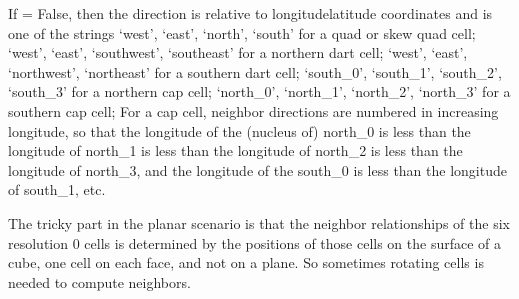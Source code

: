 \documentclass[a4paper,12ptopenany,oneside,english]{sphinxmanual}
\begin{document}
\begin{fulllineitems}
\begin{fulllineitems}
\begin{sphinxVerbatim}[commandchars=\\\{\}]
                
                
                
                 
              
                 
                
                
                
\end{sphinxVerbatim}

\sphinxAtStartPar
If  = False, then the direction is relative to
longitude\sphinxhyphen{}latitude coordinates and is one of the strings
‘west’, ‘east’, ‘north’, ‘south’ for a quad or skew quad cell;
‘west’, ‘east’, ‘southwest’, ‘southeast’ for a northern dart cell;
‘west’, ‘east’, ‘northwest’, ‘northeast’ for a southern dart cell;
‘south\_0’, ‘south\_1’, ‘south\_2’, ‘south\_3’ for a northern cap cell;
‘north\_0’, ‘north\_1’, ‘north\_2’, ‘north\_3’ for a southern cap cell;
For a cap cell, neighbor directions are numbered in increasing
longitude, so that the longitude of the (nucleus of) north\_0 is less
than the longitude of north\_1 is less than the longitude of north\_2 is
less than the longitude of north\_3, and the longitude of the south\_0 is
less than the longitude of south\_1, etc.

\sphinxAtStartPar
The tricky part in the planar scenario is that the neighbor
relationships of the six resolution 0 cells is determined by the
positions of those cells on the surface of a cube,
one cell on each face, and not on a plane.
So sometimes rotating cells is needed to compute neighbors.


\end{fulllineitems}
\end{fulllineitems}
\end{document}

